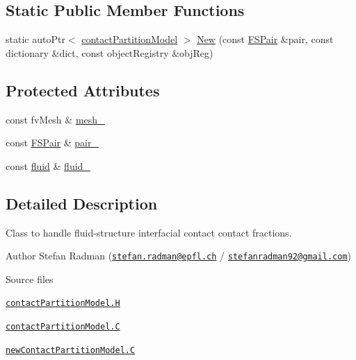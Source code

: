 \subsection*{Static Public Member Functions}
\begin{DoxyCompactItemize}
\item 
static auto\+Ptr$<$ \hyperlink{classFoam_1_1contactPartitionModel}{contact\+Partition\+Model} $>$ \hyperlink{classFoam_1_1contactPartitionModel_a927c6a9a264989270e7b289b14e52383}{New} (const \hyperlink{classFoam_1_1FSPair}{F\+S\+Pair} \&pair, const dictionary \&dict, const object\+Registry \&obj\+Reg)
\end{DoxyCompactItemize}
\subsection*{Protected Attributes}
\begin{DoxyCompactItemize}
\item 
const fv\+Mesh \& \hyperlink{classFoam_1_1contactPartitionModel_a23edeeeecebcef11921a33dd5d990570}{mesh\+\_\+}
\item 
const \hyperlink{classFoam_1_1FSPair}{F\+S\+Pair} \& \hyperlink{classFoam_1_1contactPartitionModel_a587e19a1b4f4b498d2604d20c093a73b}{pair\+\_\+}
\item 
const \hyperlink{classFoam_1_1fluid}{fluid} \& \hyperlink{classFoam_1_1contactPartitionModel_aef274d0faea6f388e2907dc335349bc9}{fluid\+\_\+}
\end{DoxyCompactItemize}


\subsection{Detailed Description}
Class to handle fluid-\/structure interfacial contact contact fractions. 

\label{_Description}%
 Author Stefan Radman (\href{mailto:stefan.radman@epfl.ch}{\tt stefan.\+radman@epfl.\+ch} / \href{mailto:stefanradman92@gmail.com}{\tt stefanradman92@gmail.\+com})

\begin{DoxyParagraph}{Source files}

\begin{DoxyItemize}
\item \href{../../../home/carlo/data/GeN-Foam/GeN-Foam_ffn/GeN-Foam/GeN-Foam/classes/thermalHydraulics/src/physicsModels/contactPartitionModels/contactPartitionModel.H}{\tt contact\+Partition\+Model.\+H} 
\item \href{../../../home/carlo/data/GeN-Foam/GeN-Foam_ffn/GeN-Foam/GeN-Foam/classes/thermalHydraulics/src/physicsModels/contactPartitionModels/contactPartitionModel.C}{\tt contact\+Partition\+Model.\+C} 
\item \href{../../../home/carlo/data/GeN-Foam/GeN-Foam_ffn/GeN-Foam/GeN-Foam/classes/thermalHydraulics/src/physicsModels/contactPartitionModels/newContactPartitionModel.C}{\tt new\+Contact\+Partition\+Model.\+C} 
\end{DoxyItemize}
\end{DoxyParagraph}



